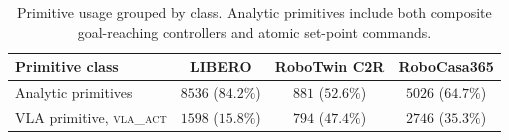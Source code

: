 \documentclass{article}
\begin{document}
\begin{table}[h]
\centering
\caption{Primitive usage grouped by class. Analytic primitives include both composite goal-reaching controllers and atomic set-point commands.}
\label{tab:primitive_usage_class}
\small
\setlength{\tabcolsep}{12pt}
\begin{tabular}{lccc}
\toprule
\textbf{Primitive class} & \textbf{LIBERO} & \textbf{RoboTwin C2R} & \textbf{RoboCasa365} \\
\midrule
Analytic primitives & $8536$ ($84.2\%$) & $881$ ($52.6\%$) & $5026$ ($64.7\%$) \\
VLA primitive, \textsc{vla\_act} & $1598$ ($15.8\%$) & $794$ ($47.4\%$) & $2746$ ($35.3\%$) \\
\bottomrule
\end{tabular}
\end{table}
\end{document}
